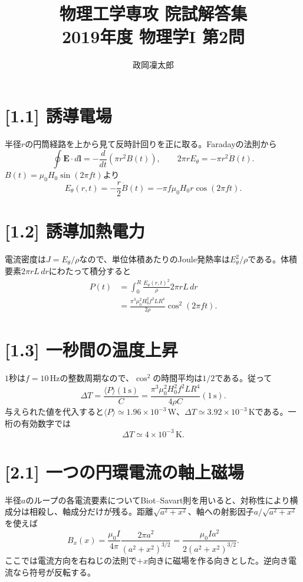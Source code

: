 \documentclass[11pt,a4paper]{article}
\title{物理工学専攻 院試解答集\\2019年度 物理学I 第2問}
\author{政岡凜太郎}
\date{}
\begin{document}
\maketitle

\section*{[1.1] 誘導電場}
半径$r$の円筒経路を上から見て反時計回りを正に取る。Faradayの法則から
\begin{equation}
 \oint\boldsymbol E\cdot d\boldsymbol l=-\frac{d}{dt}(\pi r^2B(t)),\qquad
 2\pi rE_\theta=-\pi r^2\dot B(t).
\end{equation}
$B(t)=\mu_0H_0\sin(2\pi ft)$より
\begin{equation}
 \boxed{E_\theta(r,t)=-\frac r2\dot B(t)
 =-\pi f\mu_0H_0r\cos(2\pi ft)}.
\end{equation}

\section*{[1.2] 誘導加熱電力}
電流密度は$J=E_\theta/\rho$なので、単位体積あたりのJoule発熱率は$E_\theta^2/\rho$である。体積要素$2\pi rL\,dr$にわたって積分すると
\begin{align}
 P(t)&=\int_0^R\frac{E_\theta(r,t)^2}{\rho}2\pi rL\,dr\\
 &=\frac{\pi^3\mu_0^2H_0^2f^2LR^4}{2\rho}\cos^2(2\pi ft).
\end{align}

\section*{[1.3] 一秒間の温度上昇}
$1$秒は$f=10\,\mathrm{Hz}$の整数周期なので、$\cos^2$の時間平均は$1/2$である。従って
\begin{equation}
 \Delta T=\frac{\langle P\rangle(1\,\mathrm s)}{C}
 =\frac{\pi^3\mu_0^2H_0^2f^2LR^4}{4\rho C}(1\,\mathrm s).
\end{equation}
与えられた値を代入すると$\langle P\rangle\simeq1.96\times10^{-3}\,\mathrm W$、$\Delta T\simeq3.92\times10^{-3}\,\mathrm K$である。一桁の有効数字では
\begin{equation}
 \boxed{\Delta T\simeq4\times10^{-3}\,\mathrm K}.
\end{equation}

\section*{[2.1] 一つの円環電流の軸上磁場}
半径$a$のループの各電流要素についてBiot--Savart則を用いると、対称性により横成分は相殺し、軸成分だけが残る。距離$\sqrt{a^2+x^2}$、軸への射影因子$a/\sqrt{a^2+x^2}$を使えば
\begin{equation}
 B_x(x)=\frac{\mu_0I}{4\pi}\frac{2\pi a^2}{(a^2+x^2)^{3/2}}
 =\boxed{\frac{\mu_0Ia^2}{2(a^2+x^2)^{3/2}}}.
\end{equation}
ここでは電流方向を右ねじの法則で$+x$向きに磁場を作る向きとした。逆向き電流なら符号が反転する。
\end{document}

